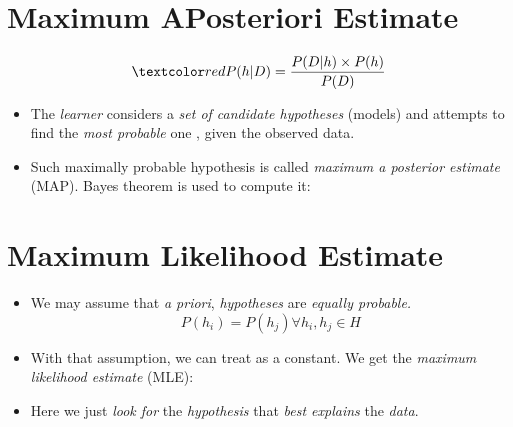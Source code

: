\documentclass[
	title={Na\:ive Bayes Learning}
]{cs584notes}
\begin{document}
\section{Maximum APosteriori Estimate}\label{sec:maximum-aposteriori-estimate}
\[ \data{ P(h|D) = \frac{P(D|h)\times P(h)}{P(D)} } \]
\begin{itemize}
	\item The \emph{learner} considers a \emph{set of candidate hypotheses}  (models) and attempts to find the \emph{most probable} one , given the observed data.
	\item Such maximally probable hypothesis is called \emph{maximum a posterior estimate} (MAP). Bayes theorem is used to compute it:
	\data{\begin{equation*}
	\begin{aligned}
		h_{MAP} &= \arg\max_{h\in H}P(h|D)\\
				&= \arg\max_{h\in H}\frac{P(D|h)\times P(h)}{P(D)}\\
				&= \arg\max_{h\in H}P(D|h)\times P(h)\\%
	\end{aligned}
	\end{equation*}}
\end{itemize}

\section{Maximum Likelihood Estimate}\label{sec:maximum-likelihood-estimate}
\begin{itemize}
	\item We may assume that \emph{a priori}, \emph{hypotheses} are \emph{equally probable.}
	\[ P(h_{i}) = P(h_{j}) \forall h_{i}, h_{j} \in H \]
	\item With that assumption, we can treat  as a constant. We get the \emph{maximum likelihood estimate} (MLE):
	\item Here we just \emph{look for} the \emph{hypothesis} that \emph{best explains} the \emph{data}.
\end{itemize}
\end{document}
